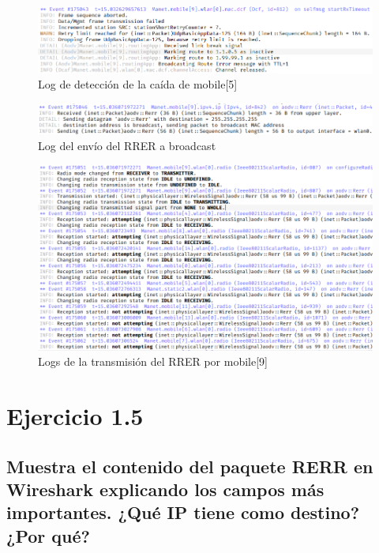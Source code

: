 \begin{figure}[H]
    \centering
    \includegraphics[width=125mm, scale=0.75]{imaxes/ejercicio4_3.png}
    \caption{Log de detección de la caída de mobile[5]}
    \label{fig:deteccioncaida}
\end{figure}

\begin{figure}[H]
    \centering
    \includegraphics[width=125mm, scale=0.75]{imaxes/ejercicio4_4.png}
    \caption{Log del envío del RRER a broadcast}
    \label{fig:caidabroadcast}
\end{figure}

\begin{figure}[H]
    \centering
    \includegraphics[width=125mm, scale=0.75]{imaxes/ejercicio4_5.png}
    \caption{Logs de la transmisión del RRER por mobile[9]}
    \label{fig:transmisioncaida}
\end{figure}

\vspace{1.25cm}
\section{Ejercicio 1.5}

\subsection{Muestra el contenido del paquete RERR en Wireshark explicando los campos más importantes. ¿Qué IP
tiene como destino? ¿Por qué?}


